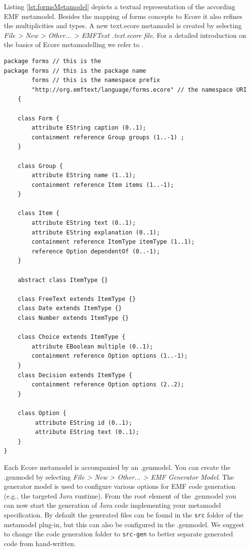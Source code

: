 	Listing \ref{lst:formsMetamodel} depicts a textual representation of the
	according EMF metamodel. Besides the mapping of forms concepts to Ecore it
	also refines the multiplicities and types. A new text.ecore metamodel is
	created by selecting \emph{File > New > Other... > EMFText .text.ecore
	file}. For a detailed introduction on the basics of Ecore metamodelling we
	refer to \cite{EMF}.

	
	\lstset{language=textecore}
	\begin{lstlisting}[label=lst:formsMetamodel, caption=Metamodel for the
	exemplary forms language written in text.ecore] package forms // this is the
package forms // this is the package name 
        forms // this is the namespace prefix
        "http://org.emftext/language/forms.ecore" // the namespace URI 
	{

	class Form {
		attribute EString caption (0..1);
		containment reference Group groups (1..-1) ;
	}
	
	class Group {
		attribute EString name (1..1);
		containment reference Item items (1..-1);
	}

	class Item {
		attribute EString text (0..1);
		attribute EString explanation (0..1);
		containment reference ItemType itemType (1..1);
		reference Option dependentOf (0..-1);
	}

	abstract class ItemType {}

	class FreeText extends ItemType {}
	class Date extends ItemType {}	
	class Number extends ItemType {}

	class Choice extends ItemType {
		attribute EBoolean multiple (0..1);
		containment reference Option options (1..-1);
	}
	class Decision extends ItemType {
		containment reference Option options (2..2);
	}
		
	class Option {
		 attribute EString id (0..1);
		 attribute EString text (0..1);
	}
}

	\end{lstlisting}
	
Each Ecore metamodel is accompanied by an .genmodel. You can create the
	.genmodel by selecting \emph{File > New > Other... > EMF Generator Model}.
	The generator model is used to configure various options for EMF code
	generation (e.g., the targeted Java runtime). From the root element of
	the .genmodel you can now start the generation of Java code implementing your metamodel
	specification. By default the generated files can be found in the \texttt{src}
	folder of the metamodel plug-in, but this can also be configured in the
	.genmodel. We suggest to change the code generation folder to \texttt{src-gen}
	to better separate generated code from hand-written.

